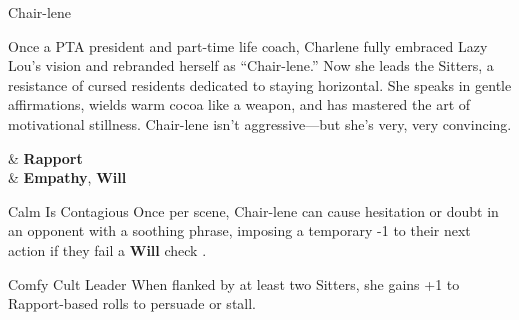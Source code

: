 \begin{NPC}[description={Soothing, Persuasive, Reclining with Authority}]{Chair-lene}

    Once a PTA president and part-time life coach, Charlene fully embraced Lazy Lou’s vision and rebranded herself as “Chair-lene.” Now she leads the Sitters, a resistance of cursed residents dedicated to staying horizontal. She speaks in gentle affirmations, wields warm cocoa like a weapon, and has mastered the art of motivational stillness. Chair-lene isn’t aggressive—but she’s very, very convincing.

    \vspace{0.5\baselineskip}
    \begin{SkillsBox}
        \Skilled & \textbf{Rapport} \\
        \Novice  & \textbf{Empathy}, \textbf{Will}
    \end{SkillsBox}

    \begin{TraitsBox}
        \item[Calm Is Contagious] Once per scene, Chair-lene can cause hesitation or doubt in an opponent with a soothing phrase, imposing a temporary -1 to their next action if they fail a \textbf{Will} check .
        \item[Comfy Cult Leader] When flanked by at least two Sitters, she gains +1 to Rapport-based rolls to persuade or stall.
    \end{TraitsBox}

    \DamageBox[%
        totalfatigue=2,%
        totalmild=1,totalmoderate=0,totalsevere=0,%
    ]
\end{NPC}

